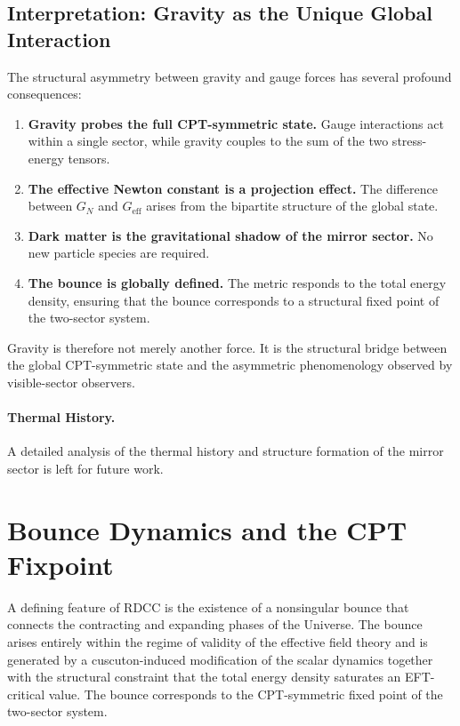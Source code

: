 \documentclass[11pt,a4paper]{article}
\begin{document}
\subsection{Interpretation: Gravity as the Unique Global Interaction}

The structural asymmetry between gravity and gauge forces has several profound
consequences:

\begin{enumerate}
    \item \textbf{Gravity probes the full CPT-symmetric state.}
    Gauge interactions act within a single sector, while gravity couples to the
    sum of the two stress-energy tensors.

    \item \textbf{The effective Newton constant is a projection effect.}
    The difference between \(G_{N}\) and \(G_{\mathrm{eff}}\) arises from the
    bipartite structure of the global state.

    \item \textbf{Dark matter is the gravitational shadow of the mirror sector.}
    No new particle species are required.

    \item \textbf{The bounce is globally defined.}
    The metric responds to the total energy density, ensuring that the bounce
    corresponds to a structural fixed point of the two-sector system.
\end{enumerate}

Gravity is therefore not merely another force. It is the structural bridge
between the global CPT-symmetric state and the asymmetric phenomenology
observed by visible-sector observers.

\paragraph{Thermal History.}
A detailed analysis of the thermal history and structure formation of the mirror sector
is left for future work.

\clearpage

\section{Bounce Dynamics and the CPT Fixpoint}
\label{sec:bounce}

A defining feature of RDCC is the existence of a nonsingular bounce that connects
the contracting and expanding phases of the Universe. The bounce arises entirely
within the regime of validity of the effective field theory and is generated by a
cuscuton-induced modification of the scalar dynamics together with the structural
constraint that the total energy density saturates an EFT-critical value. The
bounce corresponds to the CPT-symmetric fixed point of the two-sector system.
\end{document}
